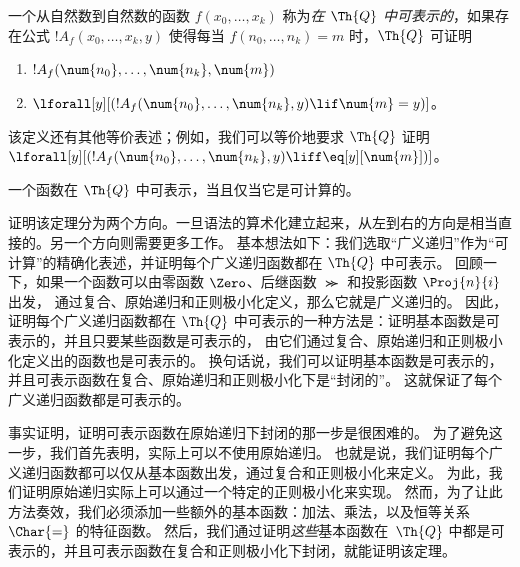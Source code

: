 \documentclass[../../../include/open-logic-section]{subfiles}
\begin{document}
\begin{defn}
  一个从自然数到自然数的函数 $f(x_0,\ldots,x_k)$
  称为{\em 在 $\Th{Q}$ 中可表示的}，如果存在公式 $!A_f(x_0,\dots,x_k,y)$
  使得每当 $f(n_0,\dots,n_k) = m$ 时，$\Th{Q}$ 可证明
\begin{enumerate}
\item{} $!A_f(\num{n_0}, \dots, \num{n_k}, \num{m})$
\item{} $\lforall[y][(!A_f(\num{n_0}, \dots,
\num{n_k}, y) \lif \num{m} = y)]$。
\end{enumerate}
\end{defn}

该定义还有其他等价表述；例如，我们可以等价地要求 $\Th{Q}$ 证明 $\lforall[y][(!A_f(\num{n_0}, \dots,
\num{n_k}, y) \liff \eq[y][\num{m}])]$。

\begin{thm}
一个函数在 $\Th{Q}$ 中可表示，当且仅当它是可计算的。
\end{thm}

证明该定理分为两个方向。一旦语法的算术化建立起来，从左到右的方向是相当直接的。另一个方向则需要更多工作。
基本想法如下：我们选取“广义递归”作为“可计算”的精确化表述，并证明每个广义递归函数都在 $\Th{Q}$ 中可表示。
回顾一下，如果一个函数可以由零函数 $\Zero$、后继函数 $\Succ$ 和投影函数 $\Proj{n}{i}$ 出发，
通过复合、原始递归和正则极小化定义，那么它就是广义递归的。
因此，证明每个广义递归函数都在 $\Th{Q}$ 中可表示的一种方法是：证明基本函数是可表示的，并且只要某些函数是可表示的，
由它们通过复合、原始递归和正则极小化定义出的函数也是可表示的。
换句话说，我们可以证明基本函数是可表示的，并且可表示函数在复合、原始递归和正则极小化下是“封闭的”。
这就保证了每个广义递归函数都是可表示的。

事实证明，证明可表示函数在原始递归下封闭的那一步是很困难的。
为了避免这一步，我们首先表明，实际上可以不使用原始递归。
也就是说，我们证明每个广义递归函数都可以仅从基本函数出发，通过复合和正则极小化来定义。
为此，我们证明原始递归实际上可以通过一个特定的正则极小化来实现。
然而，为了让此方法奏效，我们必须添加一些额外的基本函数：加法、乘法，以及恒等关系~$\Char{=}$ 的特征函数。
然后，我们通过证明\emph{这些}基本函数在~$\Th{Q}$ 中都是可表示的，并且可表示函数在复合和正则极小化下封闭，就能证明该定理。
\end{document}
